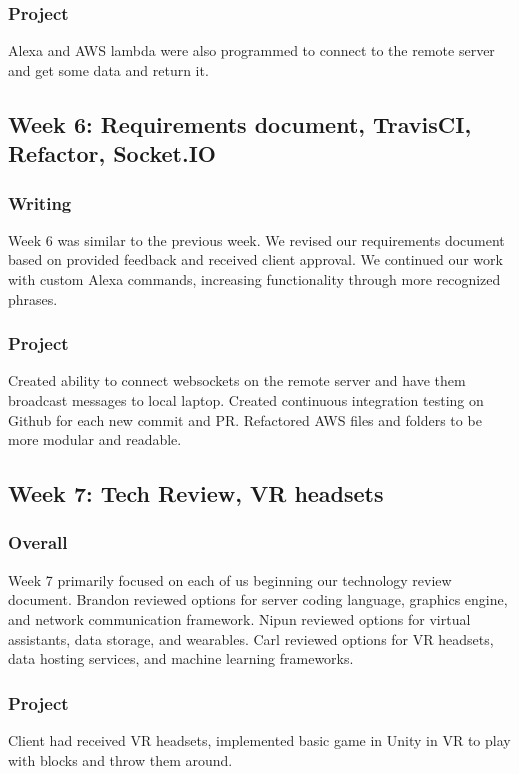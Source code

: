 \documentclass[onecolumn, draftclsnofoot,10pt, compsoc]{IEEEtran}
\begin{document}
        \subsubsection{Project}
            Alexa and AWS lambda were also programmed to connect to the remote server and get some data and return it. 
            
    
    \subsection{Week 6: Requirements document, TravisCI, Refactor, Socket.IO}
        \subsubsection{Writing}
            Week 6 was similar to the previous week. We revised our requirements document based on provided feedback and received client approval. We continued our work with custom Alexa commands, increasing functionality through more recognized phrases.
            
        \subsubsection{Project}
            Created ability to connect websockets on the remote server and have them broadcast messages to local laptop.
            Created continuous integration testing on Github for each new commit and PR.
            Refactored AWS files and folders to be  more modular and readable. 
            
    
    \subsection{Week 7: Tech Review, VR headsets}
    
        \subsubsection{Overall}
            Week 7 primarily focused on each of us beginning our technology review document. Brandon reviewed options for server coding language, graphics engine, and network communication framework. Nipun reviewed options for virtual assistants, data storage, and wearables. Carl reviewed options for VR headsets, data hosting services, and machine learning frameworks. 
            
        \subsubsection{Project}
            Client had received VR headsets, implemented basic game in Unity in VR to play with blocks and throw them around. 
    
\end{document}
